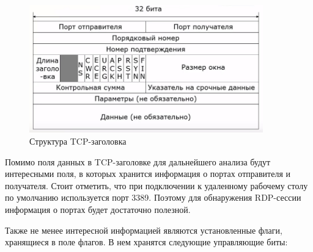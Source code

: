 \documentclass[bachelor, och, coursework]{SCWorks}
\begin{document}
      \begin{figure}[H]
        \centering
        \includegraphics[width=0.9\textwidth]{photo/tcp-segment.jpg}
        \caption{Структура TCP-заголовка}
        \label{tcp-header}
      \end{figure}
      
    Помимо поля данных в TCP-заголовке для дальнейшего анализа будут интересными поля, в которых хранится информация о портах отправителя и получателя.
    Стоит отметить, что при подключении к удаленному рабочему столу по умолчанию используется порт 3389. Поэтому для обнаружения RDP-сессии
    информация о портах будет достаточно полезной.

    Также не менее интересной информацией являются установленные флаги, хранящиеся в поле флагов. В нем хранятся следующие управляющие биты:
\end{document}
